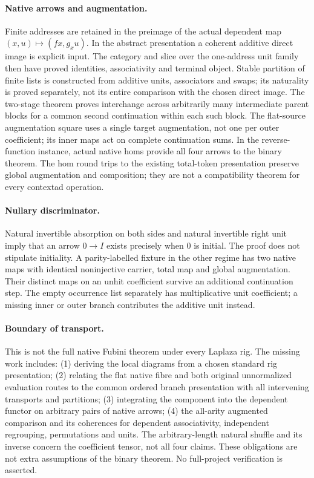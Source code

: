 \documentclass{article}
\begin{document}
\paragraph{Native arrows and augmentation.}
Finite addresses are retained in the preimage of the actual dependent map
$(x,u)\mapsto(fx,g_xu)$. In the abstract presentation a coherent additive
direct image is explicit input. The category and slice over the one-address
unit family then have proved identities, associativity and terminal object.
Stable partition of finite lists is constructed from additive units,
associators and swaps; its naturality is proved separately, not its entire
comparison with the chosen direct image. The two-stage theorem proves
interchange across arbitrarily many intermediate parent blocks for a common
second continuation within each such block. The flat-source augmentation
square uses a single target augmentation, not one per outer coefficient;
its inner maps act on complete continuation sums. In the reverse-function
instance, actual native homs provide all four arrows to the binary theorem.
The hom round trips to the existing total-token presentation preserve global
augmentation and composition; they are not a compatibility theorem for
every contextad operation.
\paragraph{Nullary discriminator.}
Natural invertible absorption on both sides and natural invertible right
unit imply that an arrow $0\to I$ exists precisely when $0$ is initial.
The proof does not stipulate initiality. A parity-labelled fixture in the
other regime has two native maps with identical noninjective carrier,
total map and global augmentation. Their distinct maps on an unhit
coefficient survive an additional continuation step. The empty occurrence
list separately has multiplicative unit coefficient; a missing inner or
outer branch contributes the additive unit instead.
\paragraph{Boundary of transport.}
This is not the full native Fubini theorem under every Laplaza rig.
The missing work includes: (1) deriving the local diagrams from a chosen
standard rig presentation; (2) relating the flat native fibre and both
original unnormalized evaluation routes to the common ordered branch
presentation with all intervening transports and partitions; (3) integrating
the component into the dependent functor on arbitrary pairs of native arrows;
(4) the all-arity augmented comparison and its coherences for dependent
associativity, independent regrouping, permutations and units. The
arbitrary-length natural shuffle and its inverse concern the coefficient
tensor, not all four claims. These obligations are not extra assumptions of
the binary theorem. No full-project verification is asserted.
\end{document}
